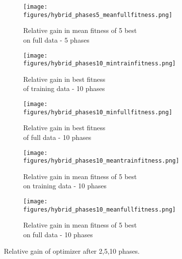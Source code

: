 \begin{figure*}
\begin{subfigure}{0.5\textwidth}
    \end{subfigure}%
    \begin{subfigure}{0.5\textwidth}
    \centering
        \texttt{[image: figures/hybrid\_phases5\_meanfullfitness.png]}
        \caption{Relative gain in mean fitness of 5 best\\ on full data - 5 phases}
        \label{fig:5phase}
    \end{subfigure}
        \begin{subfigure}{0.5\textwidth}
    \centering
    \texttt{[image: figures/hybrid\_phases10\_mintrainfitness.png]}
    \caption{Relative gain in best fitness\\ of training data - 10 phases}
    \end{subfigure}%
    \begin{subfigure}{0.5\textwidth}
    \centering
    \texttt{[image: figures/hybrid\_phases10\_minfullfitness.png]}
    \caption{Relative gain in best fitness\\ of full data - 10 phases}
    \end{subfigure}
        \begin{subfigure}{0.5\textwidth}
    \centering
    \texttt{[image: figures/hybrid\_phases10\_meantrainfitness.png]}
    \caption{Relative gain in mean fitness of 5 best\\ on training data - 10 phases}
    \end{subfigure}%
    \begin{subfigure}{0.5\textwidth}
    \centering
    \texttt{[image: figures/hybrid\_phases10\_meanfullfitness.png]}
    \caption{Relative gain in mean fitness of 5 best\\ on full data - 10 phases}
    \label{fig:10phase}
    \end{subfigure}

    \caption{Relative gain of optimizer after 2,5,10 phases.}
\end{figure*}
